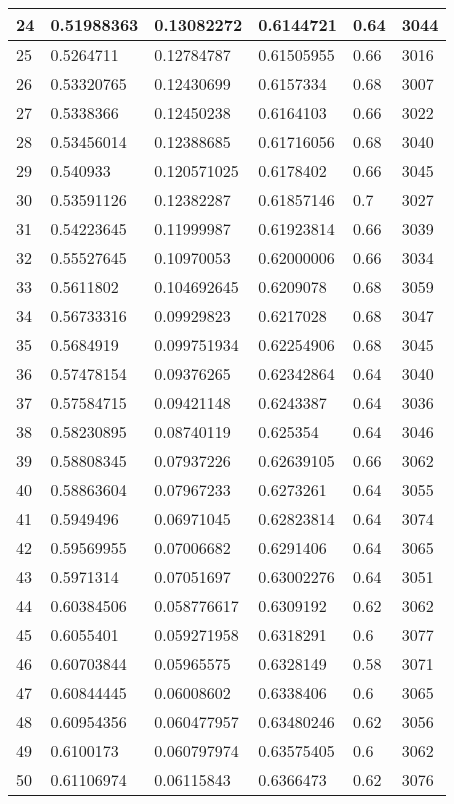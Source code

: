 \begin{longtable}{|l|l|l|l|l|l|}
24 & 0.51988363 & 0.13082272 & 0.6144721 & 0.64 & 3044 \\ \hline 
25 & 0.5264711 & 0.12784787 & 0.61505955 & 0.66 & 3016 \\ \hline 
26 & 0.53320765 & 0.12430699 & 0.6157334 & 0.68 & 3007 \\ \hline 
27 & 0.5338366 & 0.12450238 & 0.6164103 & 0.66 & 3022 \\ \hline 
28 & 0.53456014 & 0.12388685 & 0.61716056 & 0.68 & 3040 \\ \hline 
29 & 0.540933 & 0.120571025 & 0.6178402 & 0.66 & 3045 \\ \hline 
30 & 0.53591126 & 0.12382287 & 0.61857146 & 0.7 & 3027 \\ \hline 
31 & 0.54223645 & 0.11999987 & 0.61923814 & 0.66 & 3039 \\ \hline 
32 & 0.55527645 & 0.10970053 & 0.62000006 & 0.66 & 3034 \\ \hline 
33 & 0.5611802 & 0.104692645 & 0.6209078 & 0.68 & 3059 \\ \hline 
34 & 0.56733316 & 0.09929823 & 0.6217028 & 0.68 & 3047 \\ \hline 
35 & 0.5684919 & 0.099751934 & 0.62254906 & 0.68 & 3045 \\ \hline 
36 & 0.57478154 & 0.09376265 & 0.62342864 & 0.64 & 3040 \\ \hline 
37 & 0.57584715 & 0.09421148 & 0.6243387 & 0.64 & 3036 \\ \hline 
38 & 0.58230895 & 0.08740119 & 0.625354 & 0.64 & 3046 \\ \hline 
39 & 0.58808345 & 0.07937226 & 0.62639105 & 0.66 & 3062 \\ \hline 
40 & 0.58863604 & 0.07967233 & 0.6273261 & 0.64 & 3055 \\ \hline 
41 & 0.5949496 & 0.06971045 & 0.62823814 & 0.64 & 3074 \\ \hline 
42 & 0.59569955 & 0.07006682 & 0.6291406 & 0.64 & 3065 \\ \hline 
43 & 0.5971314 & 0.07051697 & 0.63002276 & 0.64 & 3051 \\ \hline 
44 & 0.60384506 & 0.058776617 & 0.6309192 & 0.62 & 3062 \\ \hline 
45 & 0.6055401 & 0.059271958 & 0.6318291 & 0.6 & 3077 \\ \hline 
46 & 0.60703844 & 0.05965575 & 0.6328149 & 0.58 & 3071 \\ \hline 
47 & 0.60844445 & 0.06008602 & 0.6338406 & 0.6 & 3065 \\ \hline 
48 & 0.60954356 & 0.060477957 & 0.63480246 & 0.62 & 3056 \\ \hline 
49 & 0.6100173 & 0.060797974 & 0.63575405 & 0.6 & 3062 \\ \hline 
50 & 0.61106974 & 0.06115843 & 0.6366473 & 0.62 & 3076 \\ \hline 
\end{longtable}